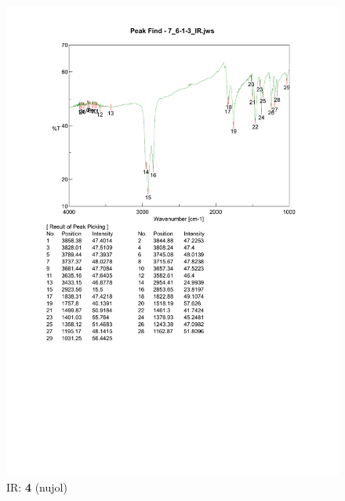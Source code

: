 \documentclass{ltjsarticle}
\theoremstyle{definition}
\numberwithin{equation}{section}
\begin{document}
\begin{figure}[htbp]
\begin{center}
\includegraphics[width = 15 cm]{IR_6-1-3.pdf}
\caption{IR: \textbf{4} (nujol)}
\label{IR_6-1-3}
\end{center}
\end{figure}
\end{document}
